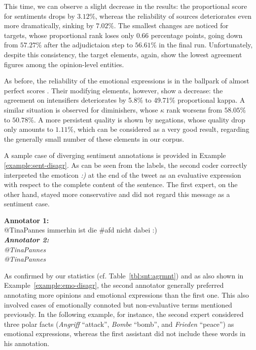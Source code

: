 This time, we can observe a slight decrease in the results: the
proportional score for sentiments drops by $3.12\%$, whereas the
reliability of sources deteriorates even more dramatically, sinking by
$7.02\%$.  The smallest changes are noticed for targets, whose
proportional rank loses only 0.66 percentage points, going down from
$57.27\%$ after the adjudictaion step to $56.61\%$ in the final run.
Unfortunately, despite this consistency, the target elements, again,
show the lowest agreement figures among the opinion-level entities.

As before, the reliability of the emotional expressions is in the
ballpark of almost perfect scores \cite[cf.][]{Landis:77}.  Their
modifying elements, however, show a decrease: the agreement on
intensifiers deteriorates by 5.8\% to 49.71\% proportional kappa.  A
similar situation is observed for diminishers, whose $\kappa$ rank
worsens from $58.05\%$ to $50.78\%$.  A more persistent quality is
shown by negations, whose quality drop only amounts to $1.11\%$, which
can be considered as a very good result, regarding the generally small
number of these elements in our corpus.


A sample case of diverging sentiment annotations is provided in
Example \ref{example:sent-disagr}.  As can be seen from the labels, the
second coder correctly interpreted the emoticon \emph{:)} at the end
of the tweet as an evaluative expression with respect to the complete
content of the sentence.  The first expert, on the other hand, stayed
more conservative and did not regard this message as a sentiment case.

{
  \renewcommand{\thesection}{\arabic{section}}
  \begin{example}\label{example:sent-disagr}
    \textbf{Annotator 1:}\\
    \upshape{}@TinaPannes immerhin ist die \#afd nicht
      dabei :)\\[0.8em]\itshape
    \textbf{Annotator 2:}\\
    \upshape{}@TinaPannes \sentiment{\textcolor{red}{immerhin ist die
        \#afd nicht dabei :)}}\\[0.8em]
    \noindent\itshape{}@TinaPannes
    \upshape{}
  \end{example}
}

As confirmed by our statistics (cf. Table~\ref{tbl:snt:agrmnt}) and as
also shown in Example~\ref{example:emo-disagr}, the second annotator
generally preferred annotating more opinions and emotional expressions
than the first one.  This also involved cases of emotionally connoted
but non-evaluative terms mentioned previously. In the following
example, for instance, the second expert considered three polar facts
(\emph{Angriff} ``attack'', \emph{Bombe} ``bomb'', and \emph{Frieden}
``peace'') as emotional expressions, whereas the first assistant did
not include these words in his annotation.

